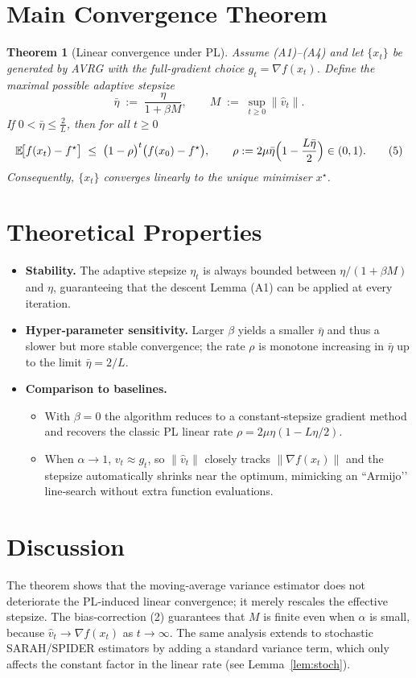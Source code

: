 \documentclass{article}
\newtheorem{theorem}{Theorem}
\newcommand{\EE}{\mathbb{E}}
\newcommand{\norm}[1]{\left\|#1\right\|}
\begin{document}
\section*{Main Convergence Theorem}
\begin{theorem}[Linear convergence under PL]\label{thm:linear}
Assume (A1)–(A4) and let $\{x_{t}\}$ be generated by AVRG with the full‑gradient choice $g_{t}=\nabla f(x_{t})$.  
Define the maximal possible adaptive stepsize
\[
\bar\eta\;:=\;\frac{\eta}{1+\beta M},\qquad 
M\;:=\;\sup_{t\ge0}\norm{\hat v_{t}}.
\]
If $0<\bar\eta\le \frac{2}{L}$, then for all $t\ge0$
\[
\EE\!\bigl[f(x_{t})-f^{\star}\bigr]\;\le\;
\bigl(1-\rho\bigr)^{t}\bigl(f(x_{0})-f^{\star}\bigr),
\qquad 
\rho:=2\mu\bar\eta\Bigl(1-\frac{L\bar\eta}{2}\Bigr)\in(0,1).
\tag{5}
\]
Consequently, $\{x_{t}\}$ converges linearly to the unique minimiser $x^{\star}$.
\end{theorem}

\section*{Theoretical Properties}
\begin{itemize}
\item \textbf{Stability.} The adaptive stepsize $\eta_{t}$ is always bounded between $\eta/(1+\beta M)$ and $\eta$, guaranteeing that the descent Lemma (A1) can be applied at every iteration.
\item \textbf{Hyper‑parameter sensitivity.} Larger $\beta$ yields a smaller $\bar\eta$ and thus a slower but more stable convergence; the rate $\rho$ is monotone increasing in $\bar\eta$ up to the limit $\bar\eta=2/L$.
\item \textbf{Comparison to baselines.}
    \begin{itemize}
        \item With $\beta=0$ the algorithm reduces to a constant‑stepsize gradient method and recovers the classic PL linear rate $\rho=2\mu\eta(1-L\eta/2)$.
        \item When $\alpha\to1$, $v_{t}\approx g_{t}$, so $\|\hat v_{t}\|$ closely tracks $\|\nabla f(x_{t})\|$ and the stepsize automatically shrinks near the optimum, mimicking an ``Armijo’’ line‑search without extra function evaluations.
    \end{itemize}
\end{itemize}

\section*{Discussion}
The theorem shows that the moving‑average variance estimator does not deteriorate the PL‑induced linear convergence; it merely rescales the effective stepsize. The bias‑correction (2) guarantees that $M$ is finite even when $\alpha$ is small, because $\hat v_{t}\to \nabla f(x_{t})$ as $t\to\infty$. The same analysis extends to stochastic SARAH/SPIDER estimators by adding a standard variance term, which only affects the constant factor in the linear rate (see Lemma~\ref{lem:stoch}).
\end{document}
